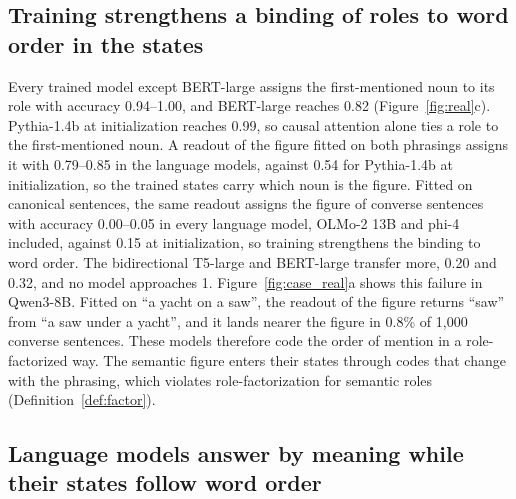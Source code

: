 \documentclass[10pt]{article}
\theoremstyle{plain}
\theoremstyle{remark}
\begin{document}
\subsection{Training strengthens a binding of roles to word order in the states}
\label{sec:roles}

Every trained model except BERT-large assigns the first-mentioned noun to its role with accuracy 0.94--1.00, and BERT-large reaches 0.82 (Figure~\ref{fig:real}c). Pythia-1.4b at initialization reaches 0.99, so causal attention alone ties a role to the first-mentioned noun. A readout of the figure fitted on both phrasings assigns it with 0.79--0.85 in the language models, against 0.54 for Pythia-1.4b at initialization, so the trained states carry which noun is the figure. Fitted on canonical sentences, the same readout assigns the figure of converse sentences with accuracy 0.00--0.05 in every language model, OLMo-2 13B and phi-4 included, against 0.15 at initialization, so training strengthens the binding to word order. The bidirectional T5-large and BERT-large transfer more, 0.20 and 0.32, and no model approaches 1. Figure~\ref{fig:case_real}a shows this failure in Qwen3-8B. Fitted on ``a yacht on a saw'', the readout of the figure returns ``saw'' from ``a saw under a yacht'', and it lands nearer the figure in 0.8\% of 1{,}000 converse sentences. These models therefore code the order of mention in a role-factorized way. The semantic figure enters their states through codes that change with the phrasing, which violates role-factorization for semantic roles (Definition~\ref{def:factor}).

\subsection{Language models answer by meaning while their states follow word order}
\label{sec:behavior}
\end{document}
